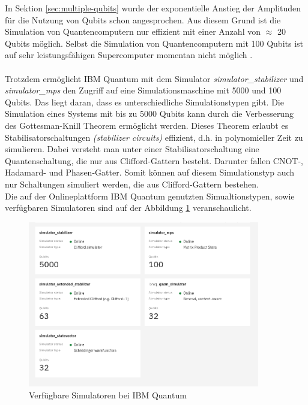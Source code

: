 In Sektion \ref{sec:multiple-qubits} wurde der exponentielle Anstieg der Amplituden f\"ur die Nutzung von Qubits schon angesprochen. Aus diesem Grund ist die Simulation von Quantencomputern nur effizient mit einer Anzahl von $\approx$ 20 Qubits m\"oglich. Selbst die Simulation von Quantencomputern mit 100 Qubits ist auf sehr leistungsf\"ahigen Supercomputer momentan nicht m\"oglich \cite{Qiskit-Textbook}. \\\\
Trotzdem erm\"oglicht IBM Quantum mit dem Simulator \textit{simulator_stabilizer} und \textit{simulator_mps} den Zugriff auf eine Simulationsmaschine mit 5000 und 100 Qubits. Das liegt daran, dass es unterschiedliche Simulationstypen gibt. Die Simulation eines Systems mit bis zu 5000 Qubits kann durch die Verbesserung des Gottesman-Knill Theorem \cite{Aaronson_2004} erm\"oglicht werden. Dieses Theorem erlaubt es Stabilisatorschaltungen \textit{(stabilizer circuits)} effizient, d.h. in polynomieller Zeit zu simulieren. Dabei versteht man unter einer Stabilisatorschaltung eine Quantenschaltung, die nur aus Clifford-Gattern besteht. Darunter fallen CNOT-, Hadamard- und Phasen-Gatter. Somit k\"onnen auf diesem Simulationstyp auch nur Schaltungen simuliert werden, die aus Clifford-Gattern bestehen.\\
Die auf der Onlineplattform IBM Quantum genutzten Simualtionstypen, sowie verf\"ugbaren Simulatoren sind auf der Abbildung \ref{fig:simulated-services} veranschaulicht. 
\begin{figure}
\centering
\includegraphics[width=0.9\textwidth]{figures/simulation_services.png}
\caption{Verf\"ugbare Simulatoren bei IBM Quantum}
\label{fig:simulated-services}
\end{figure}
